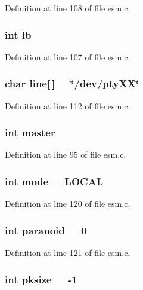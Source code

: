 Definition at line 108 of file esm.c.
\subsubsection{\setlength{\rightskip}{0pt plus 5cm}int {\bf lb}}\label{esm_8c_a33}




Definition at line 107 of file esm.c.
\subsubsection{\setlength{\rightskip}{0pt plus 5cm}char {\bf line}[$\,$] = \char`\"{}/dev/pty\-XX\char`\"{}}\label{esm_8c_a35}




Definition at line 112 of file esm.c.
\subsubsection{\setlength{\rightskip}{0pt plus 5cm}int {\bf master}}\label{esm_8c_a24}




Definition at line 95 of file esm.c.
\subsubsection{\setlength{\rightskip}{0pt plus 5cm}int {\bf mode} = LOCAL}\label{esm_8c_a37}




Definition at line 120 of file esm.c.
\subsubsection{\setlength{\rightskip}{0pt plus 5cm}int {\bf paranoid} = 0}\label{esm_8c_a38}




Definition at line 121 of file esm.c.
\subsubsection{\setlength{\rightskip}{0pt plus 5cm}int {\bf pksize} = -1}\label{esm_8c_a46}




